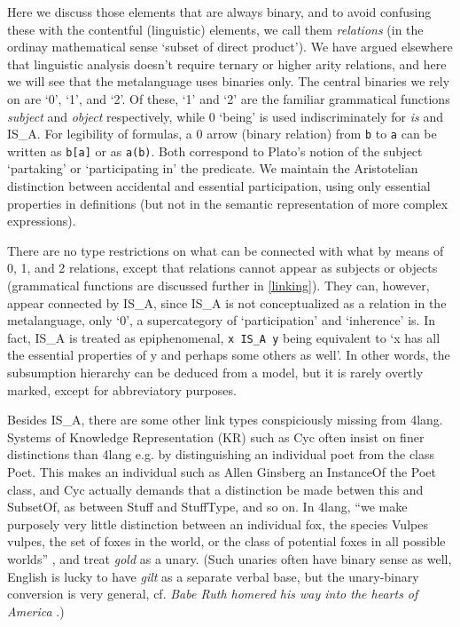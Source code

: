 \documentclass[11pt,bookmarks,bookmarksnumbered,naturalnames,plainpages=false,pdftex,colorlinks=true,urlcolor=blue,bookmarksdepth=subsection,plainpages=false]{paper}
\begin{document}
Here we discuss those elements that are always binary, and to avoid confusing
these with the contentful (linguistic) elements, we call them {\it relations}
(in the ordinay mathematical sense `subset of direct product'). We have argued
elsewhere \citep{Kornai:2012} that linguistic analysis doesn't require ternary
or higher arity relations, and here we will see that the metalanguage uses
binaries only. The central binaries we rely on are `0', `1', and `2'. Of
these, `1' and `2' are the familiar grammatical functions {\it subject} and
{\it object} respectively, while 0 `being' is used indiscriminately for {\it
  is} and IS\_A. For legibility of formulas, a 0 arrow (binary relation) from
{\tt b} to {\tt a} can be written as {\tt b[a]} or as {\tt a(b)}. Both
correspond to Plato's notion of the subject `partaking' or `participating in'
the predicate. We maintain the Aristotelian distinction between accidental and
essential participation, using only essential properties in definitions (but
not in the semantic representation of more complex expressions).

There are no type restrictions on what can be connected with what by means of
0, 1, and 2 relations, except that relations cannot appear as subjects or
objects (grammatical functions are discussed further in \ref{linking}). They
can, however, appear connected by IS\_A, since IS\_A is not conceptualized as
a relation in the metalanguage, only `0', a supercategory of `participation'
and `inherence' is. In fact, IS\_A is treated as epiphenomenal, {\tt x IS\_A
  y} being equivalent to `x has all the essential properties of y and perhaps
some others as well'. In other words, the subsumption hierarchy can be deduced
from a model, but it is rarely overtly marked, except for abbreviatory
purposes.

Besides IS\_A, there are some other link types conspiciously missing from
4lang. Systems of Knowledge Representation (KR) such as Cyc \citep{Lenat:1990}
often insist on finer distinctions than 4lang e.g. by distinguishing an
individual poet from the class Poet. This makes an individual such as Allen
Ginsberg an {\sc InstanceOf} the Poet class, and Cyc actually demands that a
distinction be made betwen this and {\sc SubsetOf}, as between {\sc Stuff} and
{\sc StuffType}, and so on. In 4lang, ``we make purposely very little
distinction between an individual fox, the species Vulpes vulpes, the set of
foxes in the world, or the class of potential foxes in all possible worlds''
\citep{Kornai:2018}, and treat {\it gold} as a unary. (Such unaries often have
binary sense as well, English is lucky to have {\it gilt} as a separate verbal
base, but the unary-binary conversion is very general, cf. {\it Babe Ruth
  homered his way into the hearts of America} \citep{Jackendoff:1990}.)
\end{document}
